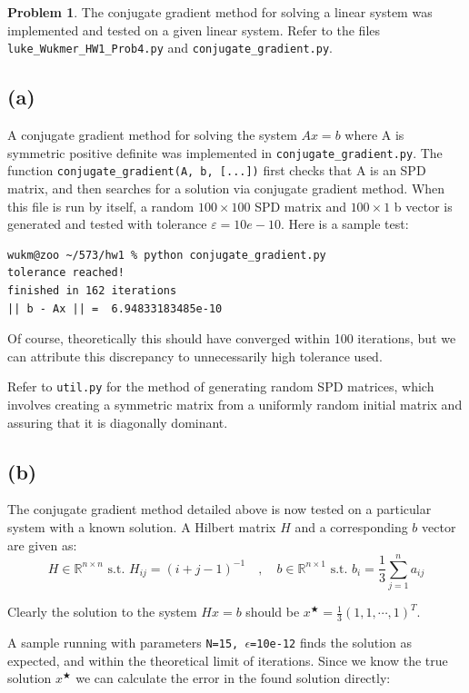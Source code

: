 \documentclass[10pt]{article}
\theoremstyle{plain}
\theoremstyle{definition}
\newtheorem{prob}{Problem}
\providecommand{\R}{\mathbb{R}}%
\numberwithin{equation}{section}
\providecommand{\st}{\text{ s.t. }}
\begin{document}
\begin{prob}
The conjugate gradient method for solving a linear system was implemented and tested on a given linear system.
Refer to the files \texttt{luke\_Wukmer\_HW1\_Prob4.py} and \texttt{conjugate\_gradient.py}.

\subsection*{(a)}

A conjugate gradient method for solving the system $Ax=b$ where A is symmetric
positive definite was implemented in \texttt{conjugate\_gradient.py}. The
function \texttt{conjugate\_gradient(A, b, [...])} first checks that A is an
SPD matrix, and then searches for a solution via conjugate gradient method.
When this file is run by itself, a random $100\times100$ SPD matrix
and $100\times1$ b vector is generated and tested with tolerance $ε=10e-10$.
Here is a sample test:

\begin{verbatim}
wukm@zoo ~/573/hw1 % python conjugate_gradient.py
tolerance reached!
finished in 162 iterations
|| b - Ax || =  6.94833183485e-10
\end{verbatim}

Of course, theoretically this should have converged within 100 iterations, but
we can attribute this discrepancy to unnecessarily high tolerance used.

Refer to \texttt{util.py} for the method of generating random SPD matrices,
which involves creating a symmetric matrix from a uniformly random initial
matrix and assuring that it is diagonally dominant.

\subsection*{(b)}

The conjugate gradient method detailed above is now tested on a particular system with a known solution. A Hilbert matrix $H$ and a corresponding $b$ vector are given as:
\[
        H \in \R^{n\times n} \st H_{ij} = \left(i + j - 1\right)^{-1} \quad , \quad
        b \in \R^{n\times 1} \st b_i = \frac{1}{3} \sum_{j=1}^n a_{ij}
    \]

    Clearly the solution to the system $Hx=b$ should be $x^{\bigstar} = \frac{1}{3}(1, 1, \cdots, 1)^T$.

A sample running with parameters \texttt{N=15, $\epsilon$=10e-12} finds the
solution as expected, and within the theoretical limit of iterations. Since we
know the true solution $x^{\bigstar}$ we can calculate the error in the found solution
directly:


\end{prob}
\end{document}
